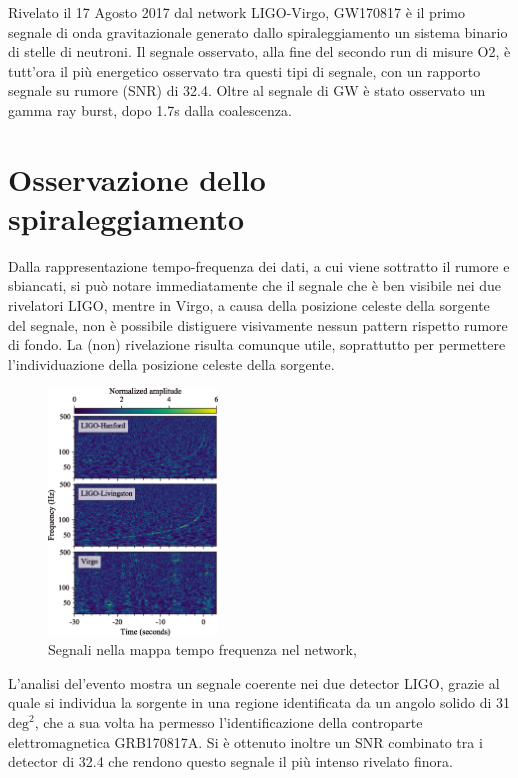 Rivelato il 17 Agosto 2017 dal network LIGO-Virgo, GW170817 è il primo segnale di onda gravitazionale generato dallo spiraleggiamento un sistema binario di stelle di neutroni.
Il segnale osservato, alla fine del secondo run di misure O2, è tutt'ora il più energetico osservato tra questi tipi di segnale, con un rapporto segnale su rumore (SNR) di 32.4.
Oltre al segnale di GW è stato osservato un gamma ray burst, dopo 1.7s dalla coalescenza.
\section{Osservazione dello spiraleggiamento}
\label{section:osservazioneInspiralGW170817}
Dalla rappresentazione tempo-frequenza dei dati, a cui viene sottratto il rumore e sbiancati, si può notare immediatamente che il segnale che è ben visibile nei due rivelatori LIGO, mentre in Virgo, a causa della posizione celeste della sorgente del segnale, non è possibile distiguere visivamente nessun pattern rispetto rumore di fondo. La (non) rivelazione risulta comunque utile, soprattutto per permettere l'individuazione della posizione celeste della sorgente.

\begin{figure}
	\vspace{-15pt}
	\begin{center}
		\includegraphics[width=0.4\textwidth]{figures/Capitolo_2/gw170817_time_freq.png}
	\end{center}
	\vspace{-7pt}
	\caption{Segnali nella mappa tempo frequenza nel network, \cite{Abbott_2017a}}
	\label{fig:osservazione_gw170817}
	\vspace{-25pt}
\end{figure}
L'analisi del'evento mostra un segnale coerente nei due detector LIGO, grazie al quale si individua la sorgente in una regione identificata da un angolo solido di 31 $\text{deg}^2$, che a sua volta ha permesso l'identificazione della controparte elettromagnetica GRB170817A. 
Si è ottenuto inoltre un SNR combinato tra i detector di 32.4 che rendono questo segnale il più intenso rivelato finora\cite{Abbott_2017a}.

